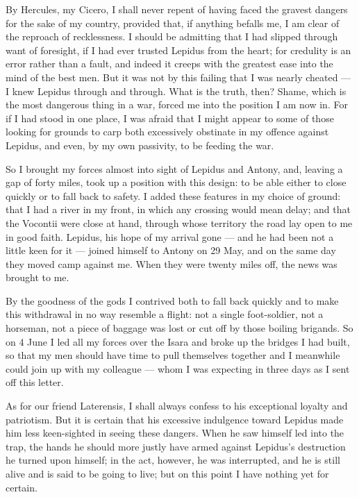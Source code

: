 

 By Hercules, my Cicero, I shall never repent of having faced the gravest dangers for the sake of my country, provided that, if anything befalls me, I am clear of the reproach of recklessness. I should be admitting that I had slipped through want of foresight, if I had ever trusted Lepidus from the heart; for credulity is an error rather than a fault, and indeed it creeps with the greatest ease into the mind of the best men. But it was not by this failing that I was nearly cheated --- I knew Lepidus through and through. What is the truth, then? Shame, which is the most dangerous thing in a war, forced me into the position I am now in. For if I had stood in one place, I was afraid that I might appear to some of those looking for grounds to carp both excessively obstinate in my offence against Lepidus, and even, by my own passivity, to be feeding the war.

 So I brought my forces almost into sight of Lepidus and Antony, and, leaving a gap of forty miles, took up a position with this design: to be able either to close quickly or to fall back to safety. I added these features in my choice of ground: that I had a river in my front, in which any crossing would mean delay; and that the Vocontii were close at hand, through whose territory the road lay open to me in good faith. Lepidus, his hope of my arrival gone --- and he had been not a little keen for it --- joined himself to Antony on 29 May, and on the same day they moved camp against me. When they were twenty miles off, the news was brought to me.

 By the goodness of the gods I contrived both to fall back quickly and to make this withdrawal in no way resemble a flight: not a single foot-soldier, not a horseman, not a piece of baggage was lost or cut off by those boiling brigands. So on 4 June I led all my forces over the Isara and broke up the bridges I had built, so that my men should have time to pull themselves together and I meanwhile could join up with my colleague --- whom I was expecting in three days as I sent off this letter.

 As for our friend Laterensis, I shall always confess to his exceptional loyalty and patriotism. But it is certain that his excessive indulgence toward Lepidus made him less keen-sighted in seeing these dangers. When he saw himself led into the trap, the hands he should more justly have armed against Lepidus's destruction he turned upon himself; in the act, however, he was interrupted, and he is still alive and is said to be going to live; but on this point I have nothing yet for certain.

